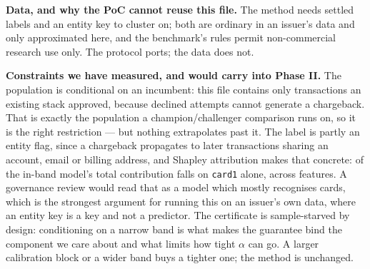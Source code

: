 \textbf{Data, and why the PoC cannot reuse this file.} The method needs settled labels and an entity key to cluster on; both are ordinary in an issuer's data and only approximated here, and the benchmark's rules permit non-commercial research use only. The protocol ports;
the data does not.

\textbf{Constraints we have measured, and would carry into Phase II.} The population is
conditional on an incumbent: this file contains only transactions an existing stack approved,
because declined attempts cannot generate a chargeback. That is exactly the population a
champion/challenger comparison runs on, so it is the right restriction --- but nothing
extrapolates past it. The label is partly an entity flag, since a chargeback propagates to
later transactions sharing an account, email or billing address, and Shapley attribution makes
that concrete: \ClaimAttributionTopShare{} of the in-band model's total contribution falls on
\texttt{card1} alone, across \ClaimAttributionFeatures{} features. A governance review would
read that as a model which mostly recognises cards, which is the strongest argument for running
this on an issuer's own data, where an entity key is a key and not a predictor. The certificate
is sample-starved by design: conditioning on a narrow band is what makes the guarantee bind the
component we care about and what limits how tight $\alpha$ can go. A larger calibration block or
a wider band buys a tighter one; the method is unchanged.
